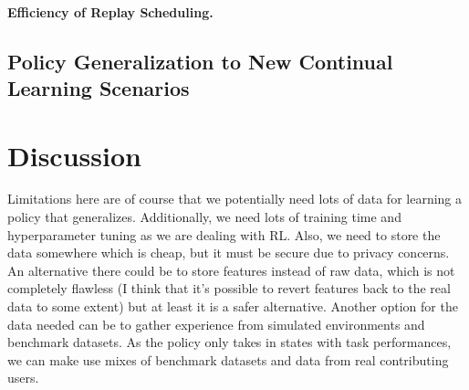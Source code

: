 \paragraph{Efficiency of Replay Scheduling.} 




\subsection{Policy Generalization to New Continual Learning Scenarios}




\section{Discussion}


 Limitations here are of course that we potentially need lots of data for learning a policy that generalizes. Additionally, we need lots of training time and hyperparameter tuning as we are dealing with RL. Also, we need to store the data somewhere which is cheap, but it must be secure due to privacy concerns. An alternative there could be to store features instead of raw data, which is not completely flawless (I think that it's possible to revert features back to the real data to some extent) but at least it is a safer alternative. Another option for the data needed can be to gather experience from simulated environments and benchmark datasets. As the policy only takes in states with task performances, we can make use mixes of benchmark datasets and data from real contributing users. 

